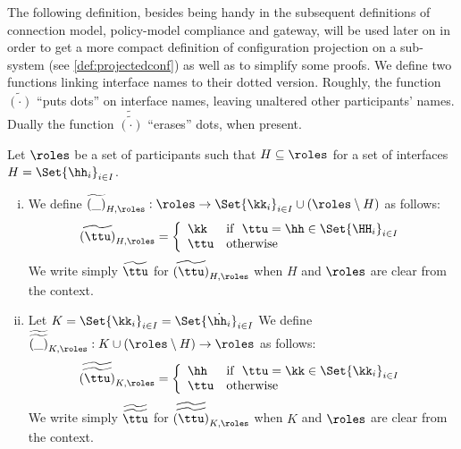 The following definition, besides being handy in the subsequent definitions of  
connection model, policy-model compliance and gateway,
will be used later on in order to get a more compact definition of
 configuration projection on a sub-system (see \cref{def:projectedconf}) as well as to simplify some proofs. 
We define two functions linking interface names to their dotted version. 
 Roughly, the function $\widetilde{(\cdot)}$ ``puts dots'' on interface names,
 leaving unaltered other participants' names. Dually 
 the function $\widetilde{\widetilde{(\cdot)}}$ ``erases'' dots, when present.
\begin{definition}Let $\roles$ be a set of participants such that  $H\subseteq\roles$ for a set of interfaces $H=\Set{\hh_i}_{i\in I}$.
\begin{enumerate}[i)]
\item
 
 We define $\widetilde{(\_)}_{H,\roles} : \roles \rightarrow \Set{\kk_i}_{i \in I}\cup(\roles\setminus H)$ as follows:
$$\widetilde{(\ttu)}_{H,\roles} = \left\{\begin{array}{l@{\quad}l}
                                                                \kk & \text{if }\ \ttu=\hh\in\Set{\HH_i}_{i \in I}\\
                                                                \ttu & \text{otherwise}
                                          \end{array}\right.$$ 
We write simply $\widetilde{\ttu}$ for $\widetilde{(\ttu)}_{H,\roles}$ when $H$ and $\roles$ are clear from the context.
\item
Let $K=\Set{\kk_i}_{i\in I}= \Set{\dot{\hh_i}}_{i\in I}$
We define $\widetilde{\widetilde{(\_)}}_{K,\roles} : K\cup(\roles\setminus H) \rightarrow \roles$ as follows:
$$\widetilde{\widetilde{(\ttu)}}_{K,\roles} = \left\{\begin{array}{l@{\quad}l}
                                                                \hh & \text{if }\ \ttu=\kk\in\Set{\kk_i}_{i \in I}\\
                                                                \ttu & \text{otherwise}
                                          \end{array}\right.$$ 
We write simply $\widetilde{\widetilde{\ttu}}$ for $\widetilde{\widetilde{(\ttu)}}_{K,\roles}$ when $K$ and $\roles$ are clear from the context.
\end{enumerate}                                         
\end{definition}


